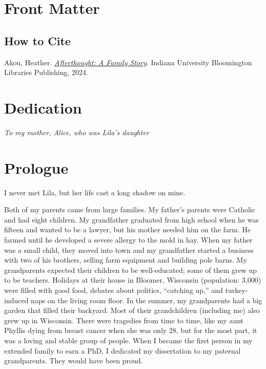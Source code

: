 \documentclass[
  letterpaper,
]{book}
\renewcommand*\contentsname{Table of contents}
\newcommand\contentsname{Table of contents}
\begin{document}

\renewcommand*\contentsname{Table of Contents}
{
\hypersetup{linkcolor=blue}
\setcounter{tocdepth}{2}
\tableofcontents
}
\listoffigures

\mainmatter
{}

\chapter{Front Matter}\label{front-matter}

\section{How to Cite}\label{how-to-cite}

Akou, Heather.
\href{https://doi.org/10.5967/rc90-k143}{\emph{Afterthought: A Family
Story}}. Indiana University Bloomington Libraries Publishing, 2024.


\chapter{Dedication}\label{dedication}

\emph{To my mother, Alice, who was Lila's daughter}


\chapter{Prologue}\label{prologue}

I never met Lila, but her life cast a long shadow on mine.

Both of my parents came from large families. My father's parents were
Catholic and had eight children. My grandfather graduated from high
school when he was fifteen and wanted to be a lawyer, but his mother
needed him on the farm. He farmed until he developed a severe allergy to
the mold in hay. When my father was a small child, they moved into town
and my grandfather started a business with two of his brothers, selling
farm equipment and building pole barns. My grandparents expected their
children to be well-educated; some of them grew up to be teachers.
Holidays at their house in Bloomer, Wisconsin (population: 3,000) were
filled with good food, debates about politics, ``catching up,'' and
turkey-induced naps on the living room floor. In the summer, my
grandparents had a big garden that filled their backyard. Most of their
grandchildren (including me) also grew up in Wisconsin. There were
tragedies from time to time, like my aunt Phyllis dying from breast
cancer when she was only 28, but for the most part, it was a loving and
stable group of people. When I became the first person in my extended
family to earn a PhD, I dedicated my dissertation to my paternal
grandparents. They would have been proud.
\end{document}
